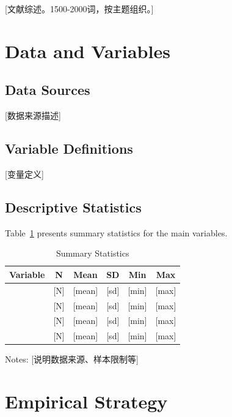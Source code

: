 \documentclass[12pt,a4paper]{article}
\begin{document}
[文献综述。1500-2000词，按主题组织。]


\section{Data and Variables}\label{sec:data}

\subsection{Data Sources}

[数据来源描述]

\subsection{Variable Definitions}

[变量定义]

\subsection{Descriptive Statistics}

Table~\ref{tab:summary} presents summary statistics for the main variables.

\begin{table}[H]
\centering
\caption{Summary Statistics}\label{tab:summary}
\begin{threeparttable}
\begin{tabular}{lccccc}
\toprule
Variable & N & Mean & SD & Min & Max \\
\midrule
[因变量] & [N] & [mean] & [sd] & [min] & [max] \\
[自变量] & [N] & [mean] & [sd] & [min] & [max] \\
[控制变量1] & [N] & [mean] & [sd] & [min] & [max] \\
[控制变量2] & [N] & [mean] & [sd] & [min] & [max] \\
\bottomrule
\end{tabular}
\begin{tablenotes}[flushleft]
\small
\item Notes: [说明数据来源、样本限制等]
\end{tablenotes}
\end{threeparttable}
\end{table}


\section{Empirical Strategy}\label{sec:strategy}
\end{document}
